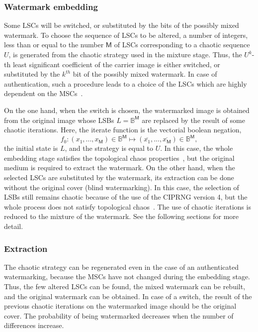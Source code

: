 \subsubsection{Watermark embedding}

Some LSCs will be switched, or substituted by the bits of the possibly mixed watermark. To choose the sequence of LSCs to be altered, a number of integers, less than or equal to the number $\mathsf{M}$ of LSCs corresponding to a chaotic sequence $U$, is generated from the chaotic strategy used in the mixture stage. Thus, the $U^{k}$-th least significant coefficient of the carrier image is either switched, or substituted by the $k^{th}$ bit of the possibly mixed watermark. In case of authentication, such a procedure leads to a choice of the LSCs which are highly dependent on the MSCs~\cite{guyeux10}.

On the one hand, when the switch is chosen, the watermarked image is obtained from the original image whose LSBs $L = \mathds{B}^{\mathsf{M}}$ are replaced by the result of some chaotic iterations. Here, the iterate function is the vectorial boolean negation,
\begin{equation}
f_0:(x_1,...,x_\mathsf{M}) \in \mathds{B}^\mathsf{M} \longmapsto (\overline{x_1},...,\overline{x_\mathsf{M}}) \in \mathds{B}^\mathsf{M},
\end{equation}
the initial state is $L$, and the strategy is equal to $U$. In this case, the whole embedding stage satisfies the topological chaos properties~\cite{guyeux10}, but the original medium is required to extract the watermark. On the other hand, when the selected LSCs are substituted by the watermark, its extraction can be done without the original cover (blind watermarking). In this case, the selection of LSBs still remains chaotic because of the use of the CIPRNG version 4, but the whole process does not satisfy topological chaos~\cite{guyeux10}. The use of chaotic iterations is reduced to the mixture of the watermark. See the following sections for more detail.

\subsubsection{Extraction}

The chaotic strategy can be regenerated even in the case of an authenticated watermarking, because the MSCs have not changed during the embedding stage. Thus, the few altered LSCs can be found, the mixed watermark can be rebuilt, and the original watermark can be obtained. In case of a switch, the result of the previous chaotic iterations on the watermarked image should be the original cover. The probability of being watermarked decreases when the number of differences increase.

